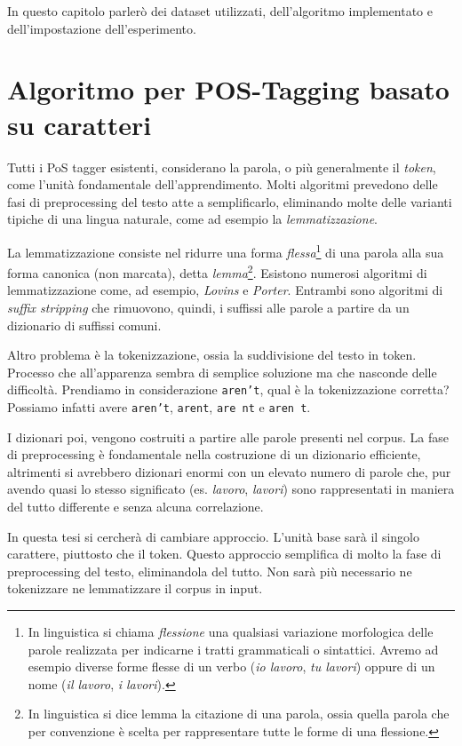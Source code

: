 \nocite{scikit-learn}

In questo capitolo parler\`o dei dataset utilizzati, dell'algoritmo implementato
e dell'impostazione dell'esperimento.

\section{Algoritmo per POS-Tagging basato su caratteri}

Tutti i PoS tagger esistenti, considerano la parola, o pi\`u generalmente il
\emph{token}, come l'unit\`a fondamentale dell'apprendimento. Molti algoritmi
prevedono delle fasi di preprocessing del testo atte a semplificarlo, eliminando
molte delle varianti tipiche di una lingua naturale, come ad esempio la \emph{lemmatizzazione}.

La lemmatizzazione consiste nel ridurre una forma \emph{flessa}\footnote{In
linguistica si chiama \emph{flessione} una qualsiasi variazione morfologica delle
parole realizzata per indicarne i tratti grammaticali o sintattici. Avremo ad
esempio diverse forme flesse di un verbo (\emph{io lavoro}, \emph{tu lavori})
oppure di un nome (\emph{il lavoro}, \emph{i lavori}).} di una parola alla sua
forma canonica (non marcata), detta \emph{lemma}\footnote{In linguistica si dice
lemma la citazione di una parola, ossia quella parola che per convenzione è scelta
per rappresentare tutte le forme di una flessione.}. Esistono numerosi algoritmi
di lemmatizzazione come, ad esempio, \emph{Lovins} e \emph{Porter}. Entrambi sono
algoritmi di \emph{suffix stripping} che rimuovono, quindi, i suffissi alle
parole a partire da un dizionario di suffissi comuni.

Altro problema \`e la tokenizzazione, ossia la suddivisione del testo in token.
Processo che all'apparenza sembra di semplice soluzione ma che nasconde delle
difficolt\`a. Prendiamo in considerazione \texttt{aren't}, qual \`e la tokenizzazione
corretta? Possiamo infatti avere \texttt{aren't}, \texttt{arent}, \texttt{are nt}
e \texttt{aren t}.

I dizionari poi, vengono costruiti a partire alle parole presenti nel corpus.
La fase di preprocessing \`e fondamentale nella costruzione di un dizionario
efficiente, altrimenti si avrebbero dizionari enormi con un elevato numero di
parole che, pur avendo quasi lo stesso significato (es. \emph{lavoro}, \emph{lavori})
sono rappresentati in maniera del tutto differente e senza alcuna correlazione.

In questa tesi si cercher\`a di cambiare approccio. L'unit\`a base sar\`a il
singolo carattere, piuttosto che il token. Questo approccio semplifica di molto
la fase di preprocessing del testo, eliminandola del tutto. Non sar\`a pi\`u
necessario ne tokenizzare ne lemmatizzare il corpus in input.

